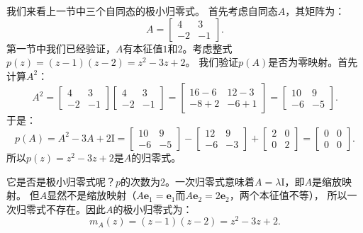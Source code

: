 \documentclass[12pt,UTF8]{ctexbook}
\begin{document}
我们来看上一节中三个自同态的极小归零式。
首先考虑自同态$A$，其矩阵为：
$$
A = \begin{bmatrix} 4 & 3 \\ -2 & -1 \end{bmatrix}.
$$
第一节中我们已经验证，$A$有本征值$1$和$2$。考虑整式$p(z) = (z-1)(z-2) = z^2 - 3z + 2$。
我们验证$p(A)$是否为零映射。首先计算$A^2$：
$$
A^2 = \begin{bmatrix} 4 & 3 \\ -2 & -1 \end{bmatrix}\begin{bmatrix} 4 & 3 \\ -2 & -1 \end{bmatrix} = \begin{bmatrix} 16-6 & 12-3 \\ -8+2 & -6+1 \end{bmatrix} = \begin{bmatrix} 10 & 9 \\ -6 & -5 \end{bmatrix}.
$$
于是：
$$
p(A) = A^2 - 3A + 2\mathrm{I} = \begin{bmatrix} 10 & 9 \\ -6 & -5 \end{bmatrix} - \begin{bmatrix} 12 & 9 \\ -6 & -3 \end{bmatrix} + \begin{bmatrix} 2 & 0 \\ 0 & 2 \end{bmatrix} = \begin{bmatrix} 0 & 0 \\ 0 & 0 \end{bmatrix}.
$$
所以$p(z) = z^2 - 3z + 2$是$A$的归零式。

它是否是极小归零式呢？$p$的次数为$2$。一次归零式意味着$A = \lambda\mathrm{I}$，即$A$是缩放映射。
但$A$显然不是缩放映射（$A\mathbf{e}_1 = \mathbf{e}_1$而$A\mathbf{e}_2 = 2\mathbf{e}_2$，两个本征值不等），
所以一次归零式不存在。因此$A$的极小归零式为：
$$
m_A(z) = (z-1)(z-2) = z^2 - 3z + 2.
$$
\end{document}
